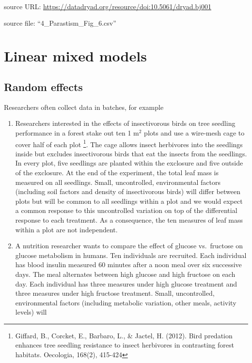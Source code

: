 \documentclass[]{book}
\providecommand{\tightlist}{%
  \setlength{\itemsep}{0pt}\setlength{\parskip}{0pt}}
\let\rmarkdownfootnote\footnote%
\def\footnote{\protect\rmarkdownfootnote}
\begin{document}
source URL: \url{https://datadryad.org/resource/doi:10.5061/dryad.bj001}

source file: ``4\_Parastism\_Fig\_6.csv''

\chapter{Linear mixed models}\label{linear-mixed-models}

\section{Random effects}\label{random-effects}

Researchers often collect data in batches, for example

\begin{enumerate}
\def\labelenumi{\arabic{enumi}.}
\tightlist
\item
  Researchers interested in the effects of insectivorous birds on tree
  seedling performance in a forest stake out ten 1 m\(^2\) plots and use
  a wire-mesh cage to cover half of each plot \footnote{Giffard, B.,
    Corcket, E., Barbaro, L., \& Jactel, H. (2012). Bird predation
    enhances tree seedling resistance to insect herbivores in
    contrasting forest habitats. Oecologia, 168(2), 415-424}. The cage
  allows insect herbivores into the seedlings inside but excludes
  insectivorous birds that eat the insects from the seedlings. In every
  plot, five seedlings are planted within the exclosure and five outside
  of the exclosure. At the end of the experiment, the total leaf mass is
  measured on all seedlings. Small, uncontrolled, environmental factors
  (including soil factors and density of insectivorous birds) will
  differ between plots but will be common to all seedlings within a plot
  and we would expect a common response to this uncontrolled variation
  on top of the differential response to each treatment. As a
  consequence, the ten measures of leaf mass within a plot are not
  independent.
\item
  A nutrition researcher wants to compare the effect of glucose
  vs.~fructose on glucose metabolism in humans. Ten individuals are
  recruited. Each individual has blood insulin measured 60 minutes after
  a noon meal over six successive days. The meal alternates between high
  glucose and high fructose on each day. Each individual has three
  measures under high glucose treatment and three measures under high
  fructose treatment. Small, uncontrolled, environmental factors
  (including metabolic variation, other meals, activity levels) will

\end{enumerate}
\end{document}
